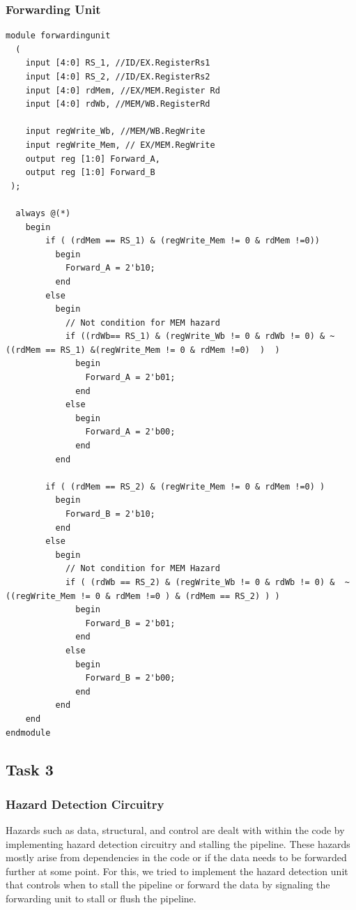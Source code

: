 \documentclass{article}
\begin{document}
\subsubsection{Forwarding Unit}
\begin{lstlisting}[caption={Design Module for Forwarding Unit}, captionpos=b, language=RISC-V]
   module forwardingunit
  (
    input [4:0] RS_1, //ID/EX.RegisterRs1
    input [4:0] RS_2, //ID/EX.RegisterRs2
    input [4:0] rdMem, //EX/MEM.Register Rd
    input [4:0] rdWb, //MEM/WB.RegisterRd
    
    input regWrite_Wb, //MEM/WB.RegWrite
    input regWrite_Mem, // EX/MEM.RegWrite
    output reg [1:0] Forward_A,
    output reg [1:0] Forward_B
 );
  
  always @(*)
    begin
    	if ( (rdMem == RS_1) & (regWrite_Mem != 0 & rdMem !=0))
          begin
          	Forward_A = 2'b10;
          end
      	else
          begin 
            // Not condition for MEM hazard 
            if ((rdWb== RS_1) & (regWrite_Wb != 0 & rdWb != 0) & ~((rdMem == RS_1) &(regWrite_Mem != 0 & rdMem !=0)  )  )
              begin
                Forward_A = 2'b01;
              end
            else
              begin
                Forward_A = 2'b00;
              end
          end
      
        if ( (rdMem == RS_2) & (regWrite_Mem != 0 & rdMem !=0) )
          begin
            Forward_B = 2'b10;
          end
        else
          begin
            // Not condition for MEM Hazard 
            if ( (rdWb == RS_2) & (regWrite_Wb != 0 & rdWb != 0) &  ~((regWrite_Mem != 0 & rdMem !=0 ) & (rdMem == RS_2) ) )
              begin
                Forward_B = 2'b01;
              end
            else
              begin
                Forward_B = 2'b00;
              end
          end
    end
endmodule
\end{lstlisting}

\subsection{Task 3}
\subsubsection{Hazard Detection Circuitry}
Hazards such as data, structural, and control are dealt with within the code by implementing hazard detection circuitry and stalling the pipeline. These hazards mostly arise from dependencies in the code or if the data needs to be forwarded further at some point. For this, we tried to implement the hazard detection unit that controls when to stall the
pipeline or forward the data by signaling the forwarding unit to stall or flush the pipeline.
\end{document}
